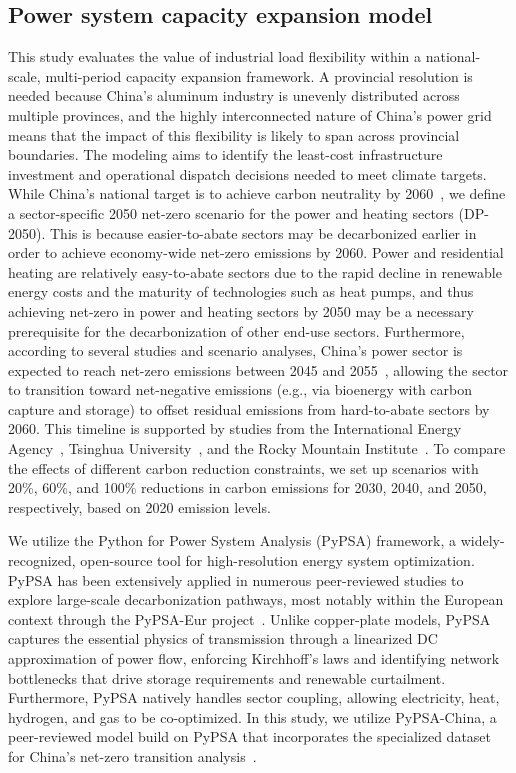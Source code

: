 \documentclass[preprint]{elsarticle}
\begin{document}
\subsection*{Power system capacity expansion model}
This study evaluates the value of industrial load flexibility within a national-scale, multi-period capacity expansion framework. A provincial resolution is needed because China's aluminum industry is unevenly distributed across multiple provinces, and the highly interconnected nature of China's power grid means that the impact of this flexibility is likely to span across provincial boundaries. The modeling aims to identify the least-cost infrastructure investment and operational dispatch decisions needed to meet climate targets. While China's national target is to achieve carbon neutrality by 2060~\citep{yang_chinas_2024}, we define a sector-specific 2050 net-zero scenario for the power and heating sectors (DP-2050). This is because easier-to-abate sectors may be decarbonized earlier in order to achieve economy-wide net-zero emissions by 2060. Power and residential heating are relatively easy-to-abate sectors due to the rapid decline in renewable energy costs and the maturity of technologies such as heat pumps, and thus achieving net-zero in power and heating sectors by 2050 may be a necessary prerequisite for the decarbonization of other end-use sectors. Furthermore, according to several studies and scenario analyses, China's power sector is expected to reach net-zero emissions between 2045 and 2055~\citep{liu_chinas_2025}, allowing the sector to transition toward net-negative emissions (e.g., via bioenergy with carbon capture and storage) to offset residual emissions from hard-to-abate sectors by 2060. This timeline is supported by studies from the International Energy Agency~\citep{iea_roadmap_2021}, Tsinghua University~\citep{tsinghua_iccsd_2020}, and the Rocky Mountain Institute~\citep{rmi_china_2050}. To compare the effects of different carbon reduction constraints, we set up scenarios with 20\%, 60\%, and 100\% reductions in carbon emissions for 2030, 2040, and 2050, respectively, based on 2020 emission levels. 

We utilize the Python for Power System Analysis (PyPSA) framework, a widely-recognized, open-source tool for high-resolution energy system optimization. PyPSA has been extensively applied in numerous peer-reviewed studies to explore large-scale decarbonization pathways, most notably within the European context through the PyPSA-Eur project~\citep{PyPSAEur}. Unlike copper-plate models, PyPSA captures the essential physics of transmission through a linearized DC approximation of power flow, enforcing Kirchhoff's laws and identifying network bottlenecks that drive storage requirements and renewable curtailment. Furthermore, PyPSA natively handles sector coupling, allowing electricity, heat, hydrogen, and gas to be co-optimized. In this study, we utilize PyPSA-China, a peer-reviewed model build on PyPSA that incorporates the specialized dataset for China's net-zero transition analysis~\citep{zhou_multienergy_2024}.
\end{document}
